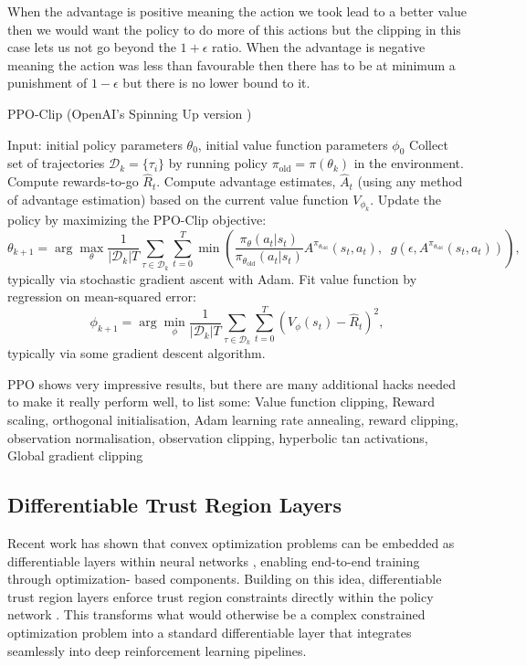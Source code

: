 When the advantage is positive meaning the action we took lead to a better value then we would want the
policy to do more of this actions but the clipping in this case lets us not go beyond the $1+\epsilon$ ratio. When 
the advantage is negative meaning the action was less than favourable then there has to be at minimum a punishment of 
$1-\epsilon$ but there is no lower bound to it. 
\begin{algorithm}[H] 
\caption{PPO-Clip (OpenAI’s Spinning Up version \cite{OpenAI_Spinning_UP})} \label{alg:PPO-Clip} 
\begin{algorithmic} 
\STATE Input: initial policy parameters $\theta_0$, initial value function parameters $\phi_0$ 
\STATE Collect set of trajectories ${\mathcal D}_k = \{\tau_i\}$ by running policy $\pi_\text{old} = \pi(\theta_k)$ in the environment. 
\STATE Compute rewards-to-go $\hat{R}_t$. 
\STATE Compute advantage estimates, $\hat{A}_t$ (using any method of advantage estimation) based on the current value function $V_{\phi_k}$. 
\STATE Update the policy by maximizing the PPO-Clip objective: 
\begin{equation*} \theta_{k+1} = \arg \max_{\theta} \frac{1}{|{\mathcal D}_k| T} \sum_{\tau \in {\mathcal D}_k} \sum_{t=0}^T 
\min\left( \frac{\pi_{\theta}(a_t|s_t)}{\pi_{\theta_\text{old}}(a_t|s_t)} A^{\pi_{\theta_\text{old}}}(s_t,a_t), \;\; g(\epsilon, A^{\pi_{\theta_\text{old}}}(s_t,a_t))
\right), 
\end{equation*} typically via stochastic gradient ascent with Adam. 
\STATE Fit value function by regression on mean-squared error: 
\begin{equation*} \phi_{k+1} = \arg \min_{\phi} \frac{1}{|{\mathcal D}_k| T} \sum_{\tau \in {\mathcal D}_k} \sum_{t=0}^T\left( V_{\phi} (s_t) - \hat{R}_t \right)^2, 
\end{equation*} typically via some gradient descent algorithm. 
\ENDFOR \end{algorithmic} \end{algorithm}
PPO shows very impressive results, but there are many additional hacks needed to make it really perform well,
to list some: Value function clipping, Reward scaling, orthogonal initialisation, Adam learning rate annealing, reward clipping, 
observation normalisation, observation clipping, hyperbolic tan activations, Global gradient clipping

\subsection{Differentiable Trust Region Layers}
Recent work has shown that convex optimization problems can be embedded as differentiable layers within neural 
networks \cite{agrawal2019differentiableconvexoptimizationlayers}, enabling end-to-end training through optimization-
based components. Building on this idea, differentiable trust region layers enforce trust region constraints directly 
within the policy network \cite{otto2021differentiabletrustregionlayers}. This transforms what would otherwise be a 
complex constrained optimization problem into a standard differentiable layer that integrates seamlessly into deep 
reinforcement learning pipelines.

